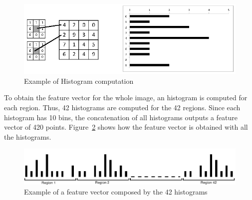 \begin{figure}[!h]
\begin{center}
\noindent \includegraphics[scale=0.5]{figures/lbp_implementation_histogram} 
\newline
\caption{Example of Histogram computation}
\label{lbp_implementation_histogram}
\end{center} 
\end{figure}

\noindent To obtain the feature vector for the whole image, an histogram is computed for each region. Thus, 42 histograms are computed for the 42 regions. Since each histogram has 10 bins, the concatenation of all histograms outputs a feature vector of 420 points. Figure~\ref{lbp_implementation_vector} shows how the feature vector is obtained with all the histograms.
\newline

\begin{figure}[!h]
\begin{center}
\noindent \includegraphics[scale=0.4]{figures/lbp_implementation_vector} 
\newline
\caption{Example of a feature vector composed by the 42 histograms}
\label{lbp_implementation_vector}
\end{center} 
\end{figure}

